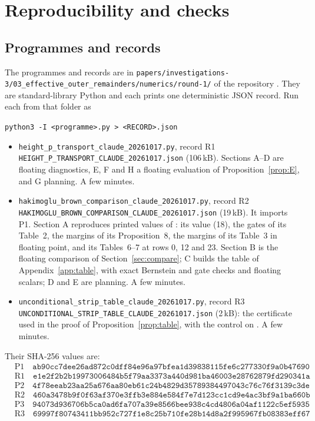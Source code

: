 \documentclass[11pt]{article}
\theoremstyle{definition}
\theoremstyle{remark}
\numberwithin{equation}{section}
\begin{document}
\section{Reproducibility and checks}\label{app:repro}

\subsection{Programmes and records}

The programmes and records are in
\nolinkurl{papers/investigations-3/03_effective_outer_remainders/numerics/round-1/}
of the repository \cite{records}. They are standard-library Python and
each prints one deterministic JSON record. Run each from that folder as
\begin{center}
\texttt{python3 -I <programme>.py > <RECORD>.json}
\end{center}
\begin{itemize}
\item[P1] \nolinkurl{height_p_transport_claude_20261017.py}, record R1
\nolinkurl{HEIGHT_P_TRANSPORT_CLAUDE_20261017.json} (106\,kB). Sections A--D
are floating diagnostics, E, F and H a floating evaluation of
Proposition~\ref{prop:E}, and G planning. A few minutes.
\item[P2] \nolinkurl{hakimoglu_brown_comparison_claude_20261017.py}, record
R2 \nolinkurl{HAKIMOGLU_BROWN_COMPARISON_CLAUDE_20261017.json} (19\,kB). It
imports P1. Section A reproduces printed values of \cite{hb}: its value
(18), the gates of its Table~2, the margins of its Proposition~8, the
margins of its Table~3 in floating point, and its Tables~6--7 at rows 0, 12
and 23. Section B is the floating
comparison of Section~\ref{sec:compare}; C builds the table of
Appendix~\ref{app:table}, with exact Bernstein and gate checks and floating
scalars; D and E are planning. A few minutes.
\item[P3] \nolinkurl{unconditional_strip_table_claude_20261017.py}, record
R3 \nolinkurl{UNCONDITIONAL_STRIP_TABLE_CLAUDE_20261017.json} (2\,kB): the
certificate used in the proof of Proposition~\ref{prop:table}, with the
control on \cite[Table~3]{hb}. A few minutes.
\end{itemize}
Their SHA-256 values are:
{\footnotesize
\begin{align*}
&\text{P1}\quad\texttt{ab90cc7dee26ad872c0dff84e96a97bfea1d39838115fe6c277330f9a0b47690}\\
&\text{R1}\quad\texttt{e1e2f2b2b19973006484b5f79aa3373a440d981ba46003e28762879fd290341a}\\
&\text{P2}\quad\texttt{4f78eeab23aa25a676aa80eb61c24b4829d35789384497043c76c76f3139c3de}\\
&\text{R2}\quad\texttt{460a3478b9f0f63af370e3ffb3e884e584f7e7d123cc1cd9e4ac3bf9a1ba660b}\\
&\text{P3}\quad\texttt{94073d936706b5ca0ad6fa707a39e8566bee938c4cd4806a04af1122c5ef5935}\\
&\text{R3}\quad\texttt{69997f80743411bb952c727f1e8c25b710fe28b14d8a2f995967fb08383eff67}
\end{align*}}
\end{document}

